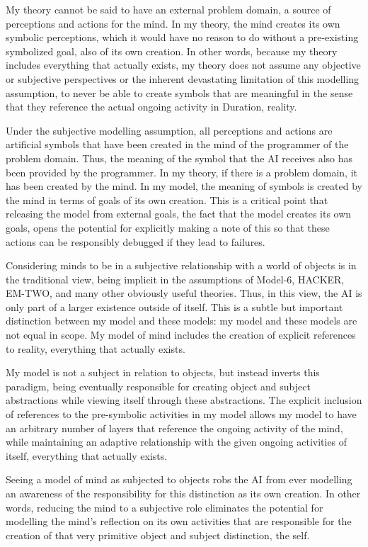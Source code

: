 My theory cannot be said to have an external problem domain, a source
of perceptions and actions for the mind.  In my theory, the mind
creates its own symbolic perceptions, which it would have no reason to
do without a pre-existing symbolized goal, also of its own creation.
In other words, because my theory includes everything that actually
exists, my theory does not assume any objective or subjective
perspectives or the inherent devastating limitation of this modelling
assumption, to never be able to create symbols that are meaningful in
the sense that they reference the actual ongoing activity in Duration,
reality.

Under the subjective modelling assumption, all perceptions and actions
are artificial symbols that have been created in the mind of the
programmer of the problem domain.  Thus, the meaning of the symbol
that the AI receives also has been provided by the programmer.  In my
theory, if there is a problem domain, it has been created by the mind.
In my model, the meaning of symbols is created by the mind in terms of
goals of its own creation.  This is a critical point that releasing
the model from external goals, the fact that the model creates its own
goals, opens the potential for explicitly making a note of this so
that these actions can be responsibly debugged if they lead to
failures.

Considering minds to be in a subjective relationship with a world of
objects is in the traditional view, being implicit in the assumptions
of Model-6, HACKER, EM-TWO, and many other obviously useful theories.
Thus, in this view, the AI is only part of a larger existence outside
of itself.  This is a subtle but important distinction between my
model and these models: my model and these models are not equal in
scope.  My model of mind includes the creation of explicit references
to reality, everything that actually exists.

My model is not a subject in relation to objects, but instead inverts
this paradigm, being eventually responsible for creating object and
subject abstractions while viewing itself through these abstractions.
The explicit inclusion of references to the pre-symbolic activities in
my model allows my model to have an arbitrary number of layers that
reference the ongoing activity of the mind, while maintaining an
adaptive relationship with the given ongoing activities of itself,
everything that actually exists.

Seeing a model of mind as subjected to objects robs the AI from ever
modelling an awareness of the responsibility for this distinction as
its own creation.  In other words, reducing the mind to a subjective
role eliminates the potential for modelling the mind's reflection on
its own activities that are responsible for the creation of that very
primitive object and subject distinction, the self.

